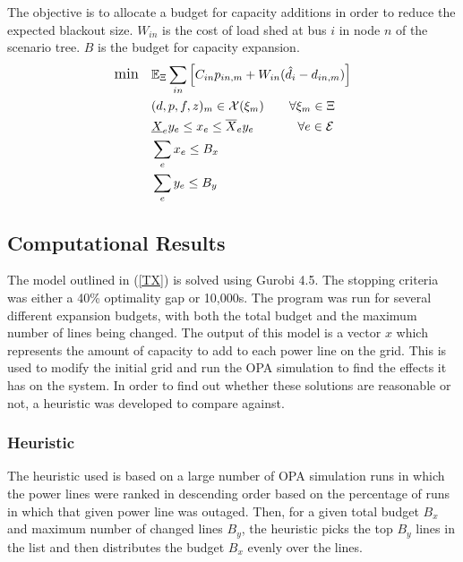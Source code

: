 The objective is to allocate a budget for capacity additions in order to reduce the expected blackout size.  $W_{in}$ is the cost of load shed at bus $i$ in node $n$ of the scenario tree.  $B$ is the budget for capacity expansion.
\begin{subequations}

\begin{align} \displaystyle
	{\large \mbox{min}} \hspace{10px} &  \Expect_\Xi \sum_{in} \left[ C_{in}  p_{in,m}  + W_{in} (\hat{d}_{i} - d_{in,m}) \right]	\\
	&(d,p,f,z)_m  \in \cX(\xi_m)    \hspace{20px}   \forall \xi_m \in \Xi	\\
	& \underline{X}_e y_e \le x_e \le \overline{X}_e y_e \hspace{35px} \forall e \in \cE\\
	&\sum_e x_e \le B_x 	\\
	& \sum_e y_e \le B_y  
\end{align}
\label{TX}
\end{subequations}



\subsection{Computational Results}
The model outlined in (\ref{TX}) is solved using Gurobi 4.5.  The stopping criteria was either a 40\% optimality gap or 10,000s.  The program was run for several different expansion budgets, with both the total budget and the maximum number of lines being changed.  The output of this model is a vector $x$ which represents the amount of capacity to add to each power line on the grid.  This is used to modify the initial grid and run the OPA simulation to find the effects it has on the system.  In order to find out whether these solutions are reasonable or not, a heuristic was developed to compare against.

\subsubsection{Heuristic}
The heuristic used is based on a large number of OPA simulation runs in which the power lines were ranked in descending order based on the percentage of runs in which that given power line was outaged.  Then, for a given total budget $B_x$ and maximum number of changed lines $B_y$, the heuristic picks the top $B_y$ lines in the list and then distributes the budget $B_x$ evenly over the lines.

